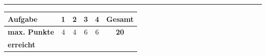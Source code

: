 \documentclass[11pt, a4paper]{article}
\begin{document}

\vspace{20pt}
\hrule
\vspace{10pt}

\noindent
\begin{tabularx}{\textwidth}{|X|c|c|c|c||c|}
\hline
\textbf{Aufgabe} & 1 & 2 & 3 & 4 & \textbf{Gesamt} \\
\hline
\textbf{max. Punkte} & 4 & 4 & 6 & 6 & \textbf{20} \\
\hline
\textbf{erreicht} & & & & & \\[0.8em]
\hline
\end{tabularx}
\end{document}
